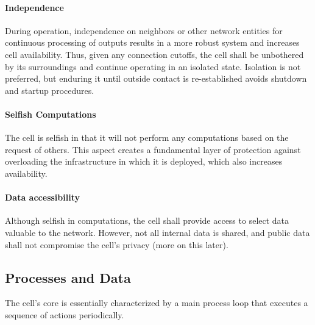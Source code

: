 \paragraph*{Independence} During operation, independence on neighbors or other network entities for continuous processing of outputs results in a more robust system and increases cell availability. Thus, given any connection cutoffs, the cell shall be unbothered by its surroundings and continue operating in an isolated state. Isolation is not preferred, but enduring it until outside contact is re-established avoids shutdown and startup procedures.

\paragraph*{Selfish Computations} The cell is selfish in that it will not perform any computations based on the request of others. This aspect creates a fundamental layer of protection against overloading the infrastructure in which it is deployed, which also increases availability.

\paragraph*{Data accessibility} Although selfish in computations, the cell shall provide access to select data valuable to the network. However, not all internal data is shared, and public data shall not compromise the cell's privacy (more on this later).

\subsection{Processes and Data}


The cell's core is essentially characterized by a main process loop that executes a sequence of actions periodically.

